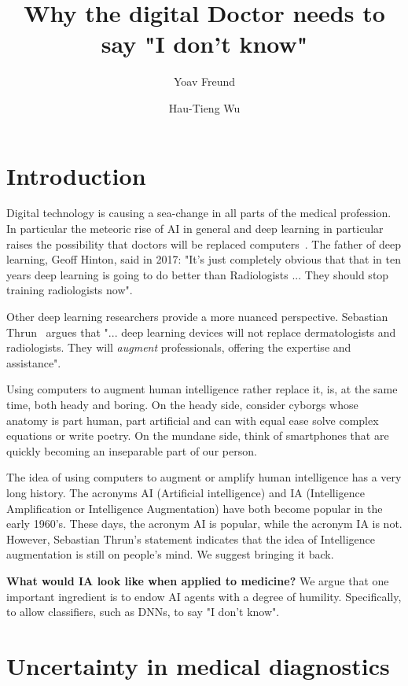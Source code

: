 \documentclass[fleqn,10pt]{wlscirep}
\title{Why the digital Doctor needs to say "I don't know"}
\author[1]{Yoav Freund}
\author[2]{Hau-Tieng Wu}
\affil[1]{UCSD, department, city, postcode, country}
\affil[2]{Duke, department, city, postcode, country}
\begin{document}
\flushbottom
\maketitle

\thispagestyle{empty}

\section*{Introduction}

Digital technology is causing a sea-change in all parts of the medical profession. In particular the meteoric rise of AI in general and deep learning in particular raises the possibility that doctors will be replaced computers~\cite{Mukherjee2017}. The father of deep learning, Geoff Hinton, said in 2017: "It's just completely obvious that that in ten years deep learning is going to do better than Radiologists ... They should stop training radiologists now".

Other deep learning researchers provide a more nuanced perspective. Sebastian Thrun~\cite{Mukherjee2017,esteva2017dermatologist} argues that "... deep learning devices will not replace dermatologists and radiologists. They will {\em augment} professionals, offering the expertise and assistance".

Using computers to augment human intelligence rather replace it, is, at the same time, both heady and boring. On the heady side, consider cyborgs whose anatomy is part human, part artificial and can with equal ease solve complex equations or write poetry. On the mundane side, think of smartphones that are quickly becoming an inseparable part of our person. 
 
The idea of using computers to augment or amplify human intelligence has a very long history. The acronyms AI (Artificial intelligence) and IA (Intelligence Amplification or Intelligence Augmentation) have both become popular in the early 1960's\cite{ashby1957introduction,engelbart1962augmenting}. These days, the acronym AI is popular, while the acronym IA is not. However, Sebastian Thrun's statement indicates that the idea of Intelligence augmentation is still on people's mind. We suggest bringing it back.

{\bf What would IA look like when applied to medicine?} We argue that one important ingredient is to endow AI agents with a 
degree of humility. Specifically, to allow classifiers, such as DNNs, to say "I don't know". 

\section*{Uncertainty in medical diagnostics}
\end{document}
